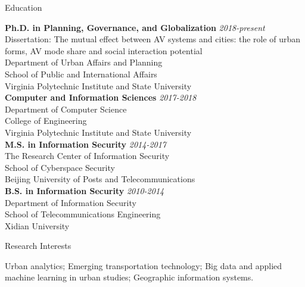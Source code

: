 \documentclass{resume} %
\begin{document}

\begin{rSection}{Education}

{\bf Ph.D. in Planning, Governance, and Globalization} \hfill {\em 2018-present} \\ 
Dissertation: The mutual effect between AV systems and cities: the role of urban forms, AV mode share and social interaction potential\\
Department of Urban Affairs and Planning\\
School of Public and International Affairs\\
Virginia Polytechnic Institute and State University\\
{\bf Computer and Information Sciences} \hfill {\em 2017-2018} \\ 
Department of Computer Science\\
College of Engineering\\
Virginia Polytechnic Institute and State University\\
{\bf M.S. in Information Security} \hfill {\em 2014-2017} \\ 
The Research Center of Information Security\\
School of Cyberspace Security\\
Beijing University of Posts and Telecommunications\\
{\bf B.S. in Information Security} \hfill {\em 2010-2014} \\ 
Department of Information Security\\
School of Telecommunications Engineering\\
Xidian University
\end{rSection}


\begin{rSection}{Research Interests}

Urban analytics; Emerging transportation technology; Big data and applied machine learning in urban studies; Geographic information systems.


\end{rSection}
\end{document}
